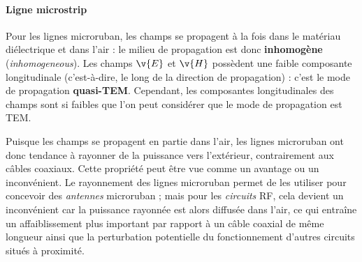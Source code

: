 \paragraph{Ligne microstrip}
Pour les lignes microruban, les champs se propagent à la fois dans le matériau
diélectrique et dans l'air : le milieu de propagation est donc
\textbf{inhomogène} (\textit{inhomogeneous}). Les champs $\v{E}$ et $\v{H}$
possèdent une faible composante longitudinale (c'est-à-dire, le long de la
direction de propagation) : c'est le mode de propagation \textbf{quasi-TEM}.
Cependant, les composantes longitudinales des champs sont si faibles que l'on
peut considérer que le mode de propagation est TEM.

Puisque les champs se propagent en partie dans l'air, les lignes microruban ont
donc tendance à rayonner de la puissance vers l'extérieur, contrairement aux
câbles coaxiaux. Cette propriété peut être vue comme un avantage ou un
inconvénient. Le rayonnement des lignes microruban permet de les utiliser pour
concevoir des \emph{antennes} microruban ; mais pour les \emph{circuits} RF,
cela devient un inconvénient car la puissance rayonnée est alors diffusée dans
l'air, ce qui entraîne un affaiblissement plus important par rapport à un câble
coaxial de même longueur ainsi que la perturbation potentielle du fonctionnement
d'autres circuits situés à proximité.

